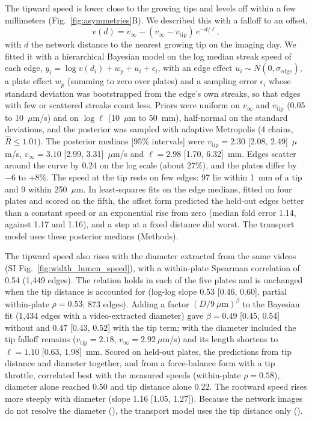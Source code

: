 The tipward speed is lower close to the growing tips and levels off within a few millimeters (Fig.~\ref{fig:asymmetries}B).
We described this with a falloff to an offset,
\[
v(d) = v_\infty - (v_\infty - v_{\mathrm{tip}})\, e^{-d/\ell},
\]
with $d$ the network distance to the nearest growing tip on the imaging day.
We fitted it with a hierarchical Bayesian model on the log median streak speed of each edge, $y_i = \log v(d_i) + w_p + u_i + \epsilon_i$, with an edge effect $u_i \sim N(0, \sigma_{\mathrm{edge}})$, a plate effect $w_p$ (summing to zero over plates) and a sampling error $\epsilon_i$ whose standard deviation was bootstrapped from the edge's own streaks, so that edges with few or scattered streaks count less.
Priors were uniform on $v_\infty$ and $v_{\mathrm{tip}}$ (0.05 to 10~$\mu$m/s) and on $\log \ell$ (10~$\mu$m to 50~mm), half-normal on the standard deviations, and the posterior was sampled with adaptive Metropolis (4 chains, $\hat{R} \leq 1.01$).
The posterior medians [95\% intervals] were $v_{\mathrm{tip}} = 2.30$ [2.08, 2.49]~$\mu$m/s, $v_\infty = 3.10$ [2.99, 3.31]~$\mu$m/s and $\ell = 2.98$ [1.70, 6.32]~mm.
Edges scatter around the curve by 0.24 on the log scale (about 27\%), and the plates differ by $-6$ to $+8$\%.
The speed at the tip rests on few edges: 97 lie within 1~mm of a tip and 9 within 250~$\mu$m.
In least-squares fits on the edge medians, fitted on four plates and scored on the fifth, the offset form predicted the held-out edges better than a constant speed or an exponential rise from zero (median fold error 1.14, against 1.17 and 1.16), and a step at a fixed distance did worst.
The transport model uses these posterior medians (Methods).

The tipward speed also rises with the diameter extracted from the same videos (SI Fig.~\ref{fig:width_lumen_speed}), with a within-plate Spearman correlation of 0.54 (1,449 edges).
The relation holds in each of the five plates and is unchanged when the tip distance is accounted for (log-log slope 0.53 [0.46, 0.60], partial within-plate $\rho = 0.53$; 873 edges).
Adding a factor ${(D/9~\mu\mathrm{m})}^\beta$ to the Bayesian fit (1,434 edges with a video-extracted diameter) gave $\beta = 0.49$ [0.45, 0.54] without and $0.47$ [0.43, 0.52] with the tip term; with the diameter included the tip falloff remains ($v_{\mathrm{tip}} = 2.18$, $v_\infty = 2.92~\mu$m/s) and its length shortens to $\ell = 1.10$ [0.63, 1.98]~mm.
Scored on held-out plates, the predictions from tip distance and diameter together, and from a force-balance form with a tip throttle, correlated best with the measured speeds (within-plate $\rho = 0.58$), diameter alone reached 0.50 and tip distance alone 0.22.
The rootward speed rises more steeply with diameter (slope 1.16 [1.05, 1.27]).
Because the network images do not resolve the diameter (), the transport model uses the tip distance only ().

